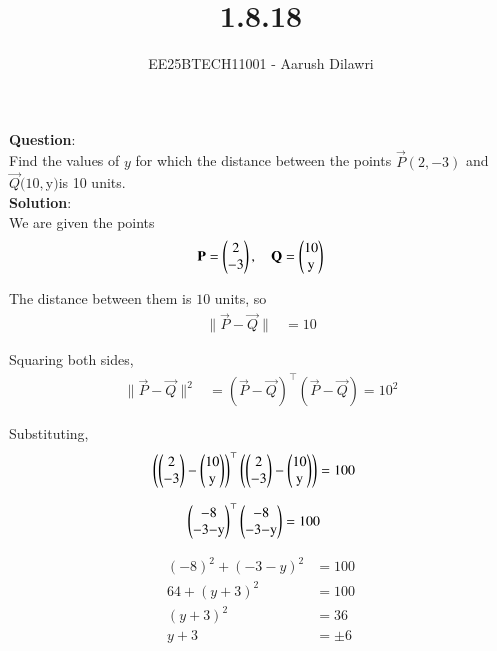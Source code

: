 \documentclass[journal]{IEEEtran}
\begin{document}

\vspace{3cm}

\title{1.8.18}
\author{EE25BTECH11001 - Aarush Dilawri}
{\let\newpage\relax\maketitle}

\renewcommand{\thefigure}{\theenumi}
\renewcommand{\thetable}{\theenumi}
\setlength{\intextsep}{10pt} %
\textbf{Question}:\\
Find the values of $y$ for which the distance between the points $\vec{P}(2,-3)$ and $\vec{Q}(10,$y$)$is 10 units.\\
\textbf{Solution}:\\

We are given the points
\begin{align}
\vec{P} = \myvec{2\\-3}, \quad 
\vec{Q} = \myvec{10\\$y$}
\end{align}

The distance between them is $10$ units, so
\begin{align}
\|\vec{P}-\vec{Q}\| &= 10
\end{align}

Squaring both sides,
\begin{align}
\|\vec{P}-\vec{Q}\|^2 &= (\vec{P}-\vec{Q})^\top(\vec{P}-\vec{Q}) = 10^2
\end{align}

Substituting,
\begin{align}
\left( \myvec{2\\-3} - \myvec{10\\$y$} \right)^\top
\left( \myvec{2\\-3} - \myvec{10\\$y$} \right) &= 100
\end{align}

\begin{align}
\myvec{-8\\-3-$y$}^\top \myvec{-8\\-3-$y$} &= 100
\end{align}

\begin{align}
(-8)^2 + (-3-y)^2 &= 100 \\
64 + (y+3)^2 &= 100 \\
(y+3)^2 &= 36 \\
y+3 &= \pm 6
\end{align}
\end{document}
